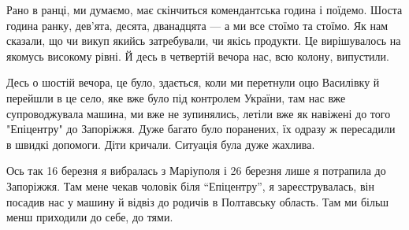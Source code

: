 Рано в ранці, ми думаємо, має скінчиться комендантська година і поїдемо. Шоста
година ранку, дев’ята, десята, дванадцята — а ми все стоїмо та стоїмо. Як нам
сказали, що чи викуп якийсь затребували, чи якісь продукти. Це вирішувалось на
якомусь високому рівні. Й десь в четвертій вечора нас, всю колону, випустили.

Десь о шостій вечора, це було, здається, коли ми перетнули оцю Василівку й
перейшли в це село, яке вже було під контролем України, там нас вже
супроводжувала машина, ми вже не зупинялись, летіли вже як навіжені до того
"Епіцентру" до Запоріжжя. Дуже багато було поранених, їх одразу ж пересадили в
швидкі допомоги. Діти кричали. Ситуація була дуже жахлива.

Ось так 16 березня я вибралась з Маріуполя і 26 березня лише я потрапила до
Запоріжжя. Там мене чекав чоловік біля \enquote{Епіцентру}, я зареєструвалась, він
посадив нас у машину й відвіз до родичів в Полтавську область. Там ми більш
менш приходили до себе, до тями.
